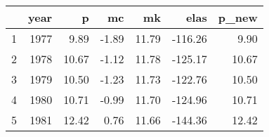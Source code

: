 \begin{tabular}{rrrrrrr}
  \hline
 & year & p & mc & mk & elas & p\_new \\ 
  \hline
1 & 1977 & 9.89 & -1.89 & 11.79 & -116.26 & 9.90 \\ 
  2 & 1978 & 10.67 & -1.12 & 11.78 & -125.17 & 10.67 \\ 
  3 & 1979 & 10.50 & -1.23 & 11.73 & -122.76 & 10.50 \\ 
  4 & 1980 & 10.71 & -0.99 & 11.70 & -124.96 & 10.71 \\ 
  5 & 1981 & 12.42 & 0.76 & 11.66 & -144.36 & 12.42 \\ 
   \hline
\end{tabular}
